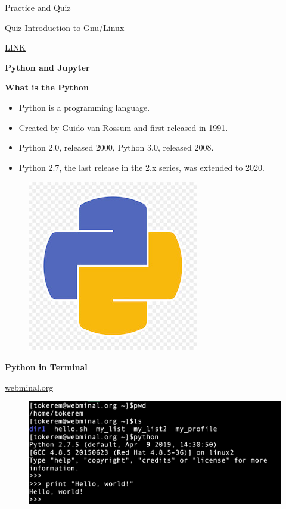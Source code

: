 \documentclass[ignorenonframetext,]{beamer}
\providecommand{\tightlist}{%
  \setlength{\itemsep}{0pt}\setlength{\parskip}{0pt}}
\begin{document}
\begin{frame}[fragile]{Practice and Quiz}
\begin{block}{Quiz}
Introduction to Gnu/Linux

\href{https://create.kahoot.it/details/1932babe-f920-47bc-9216-802e5c3d294d}{LINK}

\end{block}

\end{frame}

\begin{frame}[fragile]{\textbf{Python and Jupyter}}

\begin{block}{\textbf{What is the Python}}

\begin{itemize}
\tightlist
\item
  Python is a programming language.
\item
  Created by Guido van Rossum and first released in 1991.
\item
  Python 2.0, released 2000, Python 3.0, released 2008.
\item
  Python 2.7, the last release in the 2.x series, was extended to 2020.
\end{itemize}

\begin{figure}
\centering
\includegraphics{python.jpg}
\caption{}
\end{figure}

\end{block}

\begin{block}{\textbf{Python in Terminal}}

\href{https://www.webminal.org/terminal/}{webminal.org}

\begin{figure}
\centering
\includegraphics{python_term.png}
\caption{}
\end{figure}


\end{block}
\end{frame}
\end{document}

